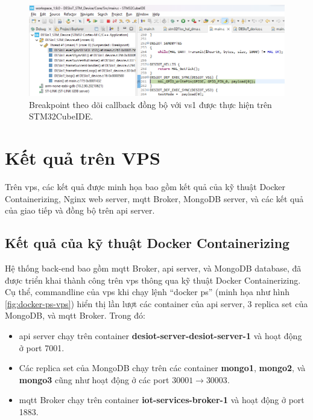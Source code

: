 \begin{figure}[htp]
\centering
\captionsetup{justification=centering}
\includegraphics[width=1.0\linewidth, frame]{images/fig-VS1-callback-trig.png}
\caption{Breakpoint theo dõi callback đồng bộ với \acrshort{vs}1 được thực hiện trên STM32CubeIDE.}
\label{fig:VS1-callback-trig}
\end{figure}

\section{Kết quả trên VPS}

Trên \acrshort{vps}, các kết quả được minh họa bao gồm kết quả của kỹ thuật Docker Containerizing, Nginx web server, \acrshort{mqtt} Broker, MongoDB server, và các kết quả của giao tiếp và đồng bộ trên \acrshort{api} server.

\subsection{Kết quả của kỹ thuật Docker Containerizing}

Hệ thống back-end bao gồm \acrshort{mqtt} Broker, \acrshort{api} server, và MongoDB database, đã được triển khai thành công trên \acrshort{vps} thông qua kỹ thuật Docker Containerizing. Cụ thể, commandline của \acrshort{vps} khi chạy lệnh ``docker ps'' (minh họa như hình \ref{fig:docker-ps-vps}) hiển thị lần lượt các container của \acrshort{api} server, 3 replica set của MongoDB, và \acrshort{mqtt} Broker. Trong đó:

\begin{itemize}
    \item \acrshort{api} server chạy trên container \textbf{desiot-server-desiot-server-1} và hoạt động ở port 7001.
    \item Các replica set của MongoDB chạy trên các container \textbf{mongo1}, \textbf{mongo2}, và \textbf{mongo3} cũng như hoạt động ở các port $30001\rightarrow 30003$.
    \item \acrshort{mqtt} Broker chạy trên container \textbf{iot-services-broker-1} và hoạt động ở port 1883.
\end{itemize}


